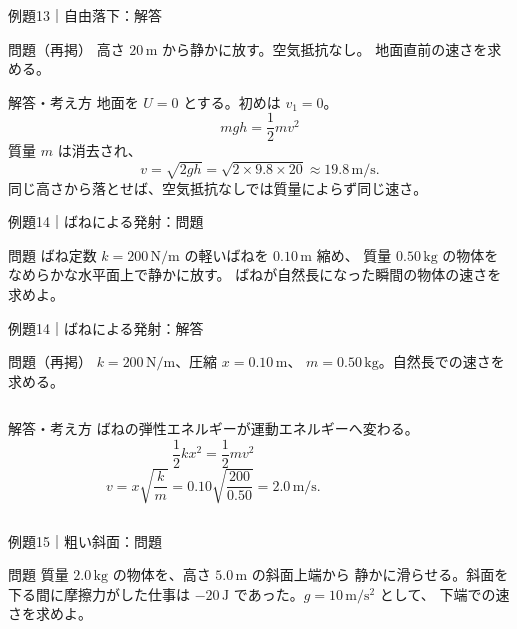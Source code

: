 \documentclass[notheorems,aspectratio=169]{beamer}
\newcommand{\qcard}[1]{%
  \begin{block}{問題}\centering\large #1\end{block}}
\newcommand{\qsmall}[1]{%
  \begin{block}{問題（再掲）}\small #1\end{block}}
\newcommand{\acard}[1]{%
  \begin{exampleblock}{解答・考え方}#1\end{exampleblock}}
\begin{document}
\begin{frame}{例題13｜自由落下：解答}
  \qsmall{
    高さ $20\,\mathrm m$ から静かに放す。空気抵抗なし。
    地面直前の速さを求める。
  }
  \acard{
    地面を $U=0$ とする。初めは $v_1=0$。
    \[
      mgh=\frac12mv^2
    \]
    質量 $m$ は消去され、
    \[
      v=\sqrt{2gh}
      =\sqrt{2\times9.8\times20}
      \approx\boxed{19.8\,\mathrm{m/s}}.
    \]
    同じ高さから落とせば、空気抵抗なしでは質量によらず同じ速さ。
  }
\end{frame}

\begin{frame}{例題14｜ばねによる発射：問題}
  \vfill
  \qcard{
    ばね定数 $k=200\,\mathrm{N/m}$ の軽いばねを $0.10\,\mathrm m$ 縮め、
    質量 $0.50\,\mathrm{kg}$ の物体をなめらかな水平面上で静かに放す。
    ばねが自然長になった瞬間の物体の速さを求めよ。
  }
  \vfill
\end{frame}

\begin{frame}{例題14｜ばねによる発射：解答}
  \qsmall{
    $k=200\,\mathrm{N/m}$、圧縮 $x=0.10\,\mathrm m$、
    $m=0.50\,\mathrm{kg}$。自然長での速さを求める。
  }
  \begin{columns}[T,onlytextwidth]
    \centering
    \acard{
      ばねの弾性エネルギーが運動エネルギーへ変わる。
      \[
        \frac12kx^2=\frac12mv^2
      \]
      \[
        v=x\sqrt{\frac{k}{m}}
        =0.10\sqrt{\frac{200}{0.50}}
        =\boxed{2.0\,\mathrm{m/s}}.
      \]
    }
  \end{columns}
\end{frame}

\begin{frame}{例題15｜粗い斜面：問題}
  \vfill
  \qcard{
    質量 $2.0\,\mathrm{kg}$ の物体を、高さ $5.0\,\mathrm m$ の斜面上端から
    静かに滑らせる。斜面を下る間に摩擦力がした仕事は
    $-20\,\mathrm J$ であった。$g=10\,\mathrm{m/s^2}$ として、
    下端での速さを求めよ。
  }
  \vfill
\end{frame}
\end{document}

